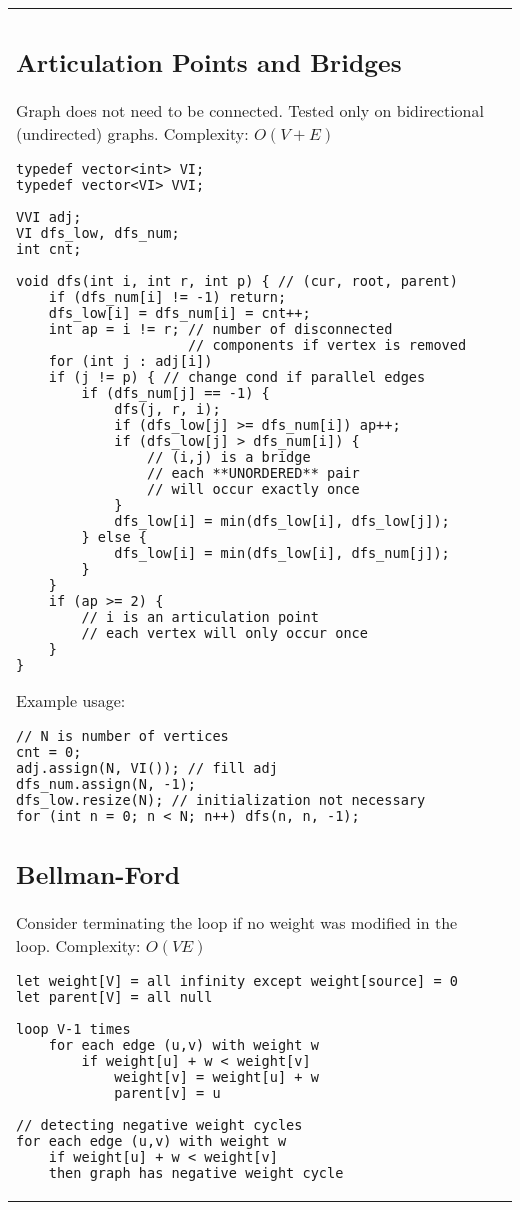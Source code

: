 \documentclass[letterpaper]{article}
\begin{document}
\vspace*{-2em}
\begin{tabular}{@{}p{9cm}p{9cm}@{}}
\subsection{Articulation Points and Bridges}
Graph does not need to be connected. Tested only on bidirectional (undirected) graphs. Complexity: $O\left(V + E\right)$

\begin{lstlisting}
typedef vector<int> VI;
typedef vector<VI> VVI;

VVI adj;
VI dfs_low, dfs_num;
int cnt;

void dfs(int i, int r, int p) { // (cur, root, parent)
	if (dfs_num[i] != -1) return;
	dfs_low[i] = dfs_num[i] = cnt++;
	int ap = i != r; // number of disconnected
	                 // components if vertex is removed
	for (int j : adj[i])
	if (j != p) { // change cond if parallel edges
		if (dfs_num[j] == -1) {
			dfs(j, r, i);
			if (dfs_low[j] >= dfs_num[i]) ap++;
			if (dfs_low[j] > dfs_num[i]) {
				// (i,j) is a bridge
				// each **UNORDERED** pair
				// will occur exactly once
			}
			dfs_low[i] = min(dfs_low[i], dfs_low[j]);
		} else {
			dfs_low[i] = min(dfs_low[i], dfs_num[j]);
		}
	}
	if (ap >= 2) {
		// i is an articulation point
		// each vertex will only occur once
	}
}
\end{lstlisting}

Example usage:
\begin{lstlisting}
// N is number of vertices
cnt = 0;
adj.assign(N, VI()); // fill adj
dfs_num.assign(N, -1);
dfs_low.resize(N); // initialization not necessary
for (int n = 0; n < N; n++) dfs(n, n, -1);
\end{lstlisting}

\subsection{Bellman-Ford}

Consider terminating the loop if no weight was modified in the loop. Complexity: $O(VE)$

\begin{lstlisting}
let weight[V] = all infinity except weight[source] = 0
let parent[V] = all null

loop V-1 times
	for each edge (u,v) with weight w
		if weight[u] + w < weight[v]
			weight[v] = weight[u] + w
			parent[v] = u

// detecting negative weight cycles
for each edge (u,v) with weight w
	if weight[u] + w < weight[v]
	then graph has negative weight cycle
\end{lstlisting}



\end{tabular}
\end{document}
